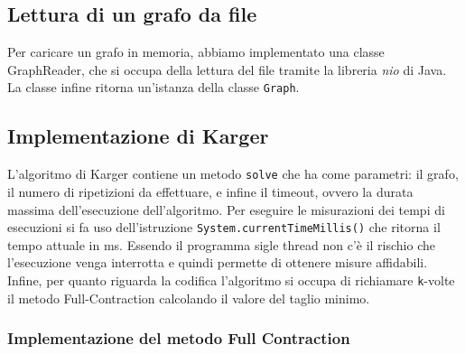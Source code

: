 \subsection{Lettura di un grafo da file}
Per caricare un grafo in memoria, abbiamo implementato una classe GraphReader, 
che si occupa della lettura del file tramite la libreria \textit{nio} di Java. 
La classe infine ritorna un'istanza della classe \texttt{Graph}.
\subsection{Implementazione di Karger}
L'algoritmo di Karger contiene un metodo \texttt{solve} che ha come parametri: il grafo, 
il numero di ripetizioni da effettuare, e infine il timeout, ovvero la durata massima 
dell'esecuzione dell'algoritmo.
Per eseguire le misurazioni dei tempi di esecuzioni si fa uso dell'istruzione 
\texttt{System.currentTimeMillis()} che ritorna il tempo attuale in ms. 
Essendo il programma sigle thread non c'è il rischio che l'esecuzione venga interrotta e 
quindi permette di ottenere misure affidabili. 
Infine, per quanto riguarda la codifica l'algoritmo si occupa di richiamare \texttt{k}-volte
il metodo Full-Contraction calcolando il valore del taglio minimo.
\subsubsection{Implementazione del metodo Full Contraction}